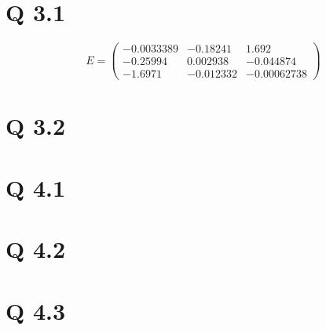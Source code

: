 \documentclass[11pt]{article}
\begin{document}
\section*{Q 3.1}
    $$E=\left(\begin{array}{ccc} -0.0033389 & -0.18241 & 1.692\\ -0.25994 & 0.002938 & -0.044874\\ -1.6971 &
 -0.012332 & -0.00062738 \end{array}\right)$$
\section*{Q 3.2}

\section*{Q 4.1}
\section*{Q 4.2}
\section*{Q 4.3}
\begin{figure}[H]
\end{figure}
\end{document}
